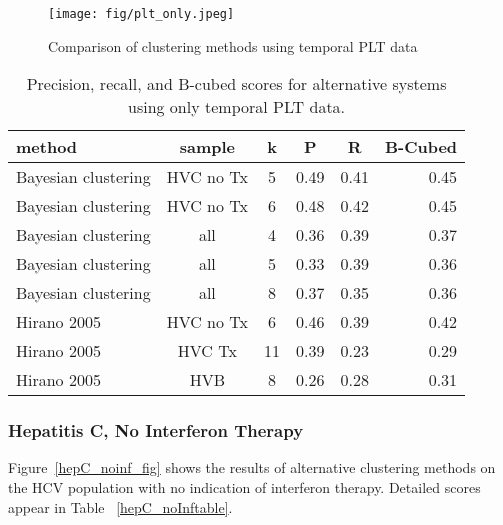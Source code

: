 \begin{figure}[ht!]
\vskip 0.2in
\begin{center}
\centerline{\texttt{[image: fig/plt\_only.jpeg]}}
\caption{Comparison of clustering methods using temporal PLT data}
\label{plt_only}
\end{center}
\vskip -0.2in
\end{figure}

\begin{table}[ht]
\caption{Precision, recall, and B-cubed scores for alternative systems using only temporal PLT data.}
\label{pltdatatable}
\vskip 0.15in
\begin{center}
\begin{tabular}{lccccr}
\hline
\hline
method	& sample &k	& P	& R	& B-Cubed \\
\hline
\hline
Bayesian clustering	& HVC no Tx & 5& 0.49& 0.41& 0.45 \\
Bayesian clustering	& HVC no Tx & 6& 0.48& 0.42& 0.45 \\
Bayesian clustering	& all & 4& 0.36& 0.39& 0.37 \\
Bayesian clustering	& all & 5& 0.33& 0.39& 0.36 \\
Bayesian clustering	& all & 8& 0.37& 0.35& 0.36 \\
Hirano 2005 & HVC no Tx   & 6& 0.46& 0.39& 0.42 \\
Hirano 2005 & HVC Tx   & 11& 0.39& 0.23& 0.29 \\
Hirano 2005 & HVB   & 8& 0.26& 0.28& 0.31 \\
		
\hline
\hline
\end{tabular}
\end{center}
\end{table}


\subsubsection{Hepatitis C, No Interferon Therapy}
\label{hep_results_noinf}
Figure~\ref{hepC_noinf_fig} shows the results of alternative clustering methods on the HCV population with no indication of interferon therapy.  Detailed scores appear in Table ~\ref{hepC_noInftable}.

